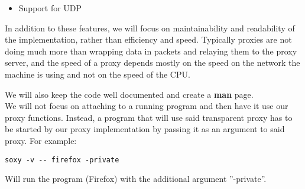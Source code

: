 \documentclass[a4paper]{article}
\begin{document}
\begin{itemize}
\item Support for UDP
\end{itemize}

In addition to these features, we will focus on maintainability and readability
of the implementation, rather than efficiency and speed. Typically proxies are
not doing much more than wrapping data in packets and relaying them to the proxy
server, and the speed of a proxy depends mostly on the speed on the network the
machine is using and not on the speed of the CPU.

We will also keep the code well documented and create a \textbf{man} page. \\

We will not focus on attaching to a running program and then have it use our
proxy functions. %
Instead, a program that will use said transparent proxy has to be started by our
proxy implementation by passing it as an argument to said proxy. For example:

\begin{verbatim}
soxy -v -- firefox -private
\end{verbatim}

Will run the program (Firefox) with the additional argument ''-private''.
\end{document}

